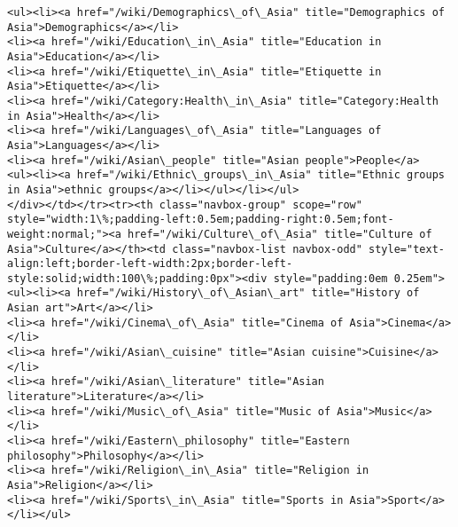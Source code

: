\documentclass[11pt]{article}
\begin{document}
\begin{Verbatim}[commandchars=\\\{\}]
<ul><li><a href="/wiki/Demographics\_of\_Asia" title="Demographics of Asia">Demographics</a></li>
<li><a href="/wiki/Education\_in\_Asia" title="Education in Asia">Education</a></li>
<li><a href="/wiki/Etiquette\_in\_Asia" title="Etiquette in Asia">Etiquette</a></li>
<li><a href="/wiki/Category:Health\_in\_Asia" title="Category:Health in Asia">Health</a></li>
<li><a href="/wiki/Languages\_of\_Asia" title="Languages of Asia">Languages</a></li>
<li><a href="/wiki/Asian\_people" title="Asian people">People</a>
<ul><li><a href="/wiki/Ethnic\_groups\_in\_Asia" title="Ethnic groups in Asia">ethnic groups</a></li></ul></li></ul>
</div></td></tr><tr><th class="navbox-group" scope="row" style="width:1\%;padding-left:0.5em;padding-right:0.5em;font-weight:normal;"><a href="/wiki/Culture\_of\_Asia" title="Culture of Asia">Culture</a></th><td class="navbox-list navbox-odd" style="text-align:left;border-left-width:2px;border-left-style:solid;width:100\%;padding:0px"><div style="padding:0em 0.25em">
<ul><li><a href="/wiki/History\_of\_Asian\_art" title="History of Asian art">Art</a></li>
<li><a href="/wiki/Cinema\_of\_Asia" title="Cinema of Asia">Cinema</a></li>
<li><a href="/wiki/Asian\_cuisine" title="Asian cuisine">Cuisine</a></li>
<li><a href="/wiki/Asian\_literature" title="Asian literature">Literature</a></li>
<li><a href="/wiki/Music\_of\_Asia" title="Music of Asia">Music</a></li>
<li><a href="/wiki/Eastern\_philosophy" title="Eastern philosophy">Philosophy</a></li>
<li><a href="/wiki/Religion\_in\_Asia" title="Religion in Asia">Religion</a></li>
<li><a href="/wiki/Sports\_in\_Asia" title="Sports in Asia">Sport</a></li></ul>

\end{Verbatim}
\end{document}

